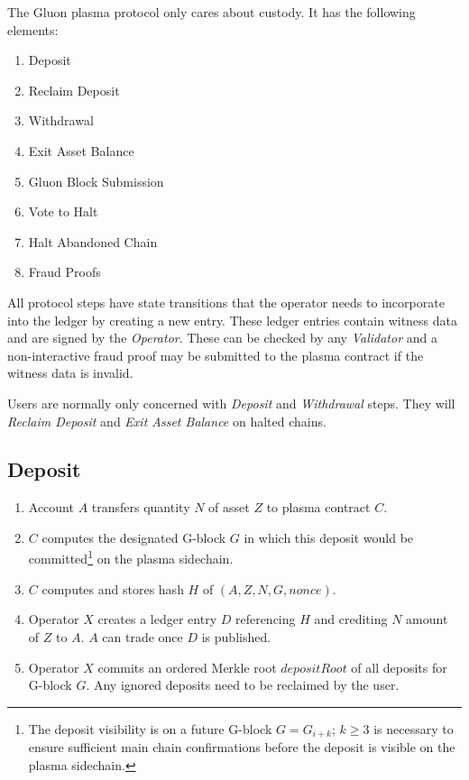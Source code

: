 \documentclass[12pt,a4paper]{article}
\begin{document}
The Gluon plasma protocol only cares about custody. It has the following elements:

\begin{enumerate}
    \item Deposit
    \item Reclaim Deposit
    \item Withdrawal
    \item Exit Asset Balance
    \item Gluon Block Submission
    \item Vote to Halt
    \item Halt Abandoned Chain
    \item Fraud Proofs
\end{enumerate}

All protocol steps have state transitions that the operator needs to incorporate into the ledger by creating a new entry. These ledger entries contain witness data and are signed by the \emph{Operator}. These can be checked by any \emph{Validator} and a non-interactive fraud proof may be submitted to the plasma contract if the witness data is invalid. 

Users are normally only concerned with \emph{Deposit} and \emph{Withdrawal} steps. They will \emph{Reclaim Deposit} and \emph{Exit Asset Balance} on halted chains.

\subsection{Deposit}\label{gp:deposit}
\begin{mdframed}
\begin{enumerate}
    \item Account $A$ transfers quantity $N$ of asset $Z$ to plasma contract $C$. 
    \item $C$ computes the designated G-block $G$ in which this deposit would be committed\footnote{The deposit visibility is on a future G-block $G = G_{i+k}$; $k \geq 3$ is necessary to ensure sufficient main chain confirmations before the deposit is visible on the plasma sidechain.} on the plasma sidechain.
    \item $C$ computes and stores hash $H$ of \((A, Z, N, G, nonce)\).
    \item Operator $X$ creates a ledger entry $D$ referencing $H$ and crediting $N$ amount of $Z$ to $A$. $A$ can trade once $D$ is published.
    \item Operator $X$ commits an ordered Merkle root $depositRoot$ of all deposits for G-block $G$. Any ignored deposits need to be reclaimed by the user.
\end{enumerate}
\end{mdframed}
\end{document}
